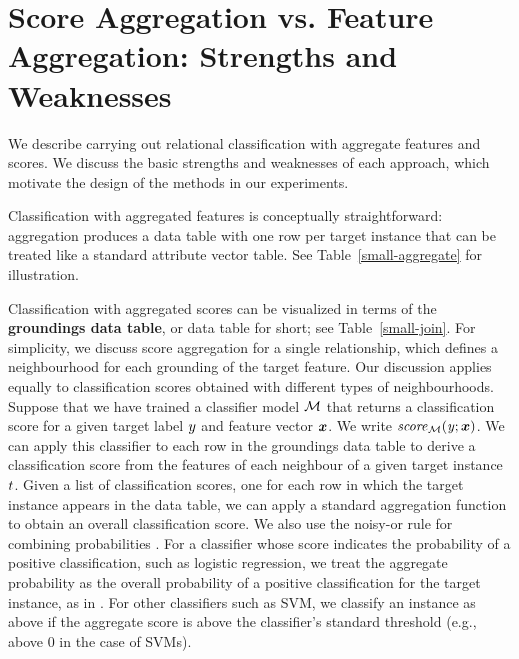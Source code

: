 \documentclass[conference]{IEEEtran}
\begin{document}
\section{Score Aggregation vs. Feature Aggregation: Strengths and Weaknesses} We describe carrying out relational classification with aggregate features and scores. We discuss the basic strengths and weaknesses of each approach, which motivate the design of the methods in our experiments.

Classification with aggregated features is conceptually straightforward: aggregation produces a data table with one row per target instance that can be treated like a standard attribute vector table. See Table~\ref{small-aggregate} for illustration.

Classification with aggregated scores can be visualized in terms of the \textbf{groundings data table}, or data table for short; see Table~\ref{small-join}. For simplicity, we discuss score aggregation for a single relationship, which defines a neighbourhood for each grounding of the target feature. Our discussion applies equally to classification scores obtained with different types of neighbourhoods. 
%
Suppose that we have trained a classifier model $\mathcal{M}$ that returns a classification score for a given target label $y$ and feature vector $\boldsymbol{x}$. We write $\it{score}_{\mathcal{M}}(y;\boldsymbol{x})$. We can apply this classifier to each row in the groundings data table to derive a classification score from the features of each neighbour of a given target instance $t$.
%
Given a list of classification scores, one for each row in which the target instance appears in the data table, we can apply a standard aggregation function to obtain an overall classification score. We also use the noisy-or rule for combining probabilities \cite{Kersting2007}. For a classifier whose score indicates the probability of a positive classification, such as logistic regression, we treat the aggregate probability as the overall probability of a positive classification for the target instance, as in \cite{Neville2003}. For other classifiers such as SVM, we classify an instance as above if the aggregate score is above the classifier's standard threshold (e.g., above 0 in the case of SVMs).
%
\end{document}
